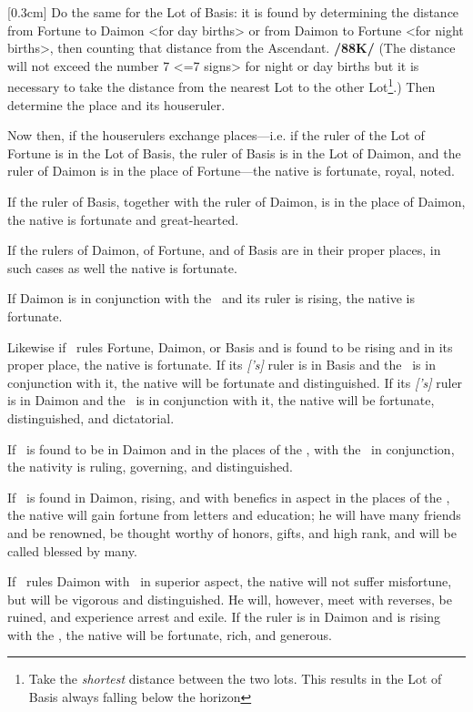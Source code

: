 [0.3cm]
Do the same for the Lot of Basis: it is found by determining the distance from Fortune to Daimon <for day births> or from Daimon to Fortune <for night births>, then counting that distance from the Ascendant. \textbf{/88K/} (The distance will not exceed the number 7 <=7 signs> for night or day births but it is necessary to take the distance from the nearest Lot to the other Lot\footnote{Take the \textsl{shortest} distance between the two lots. This results in the Lot of Basis always falling below the horizon}.) Then determine the place and its houseruler.

Now then, if the houserulers exchange places—i.e. if the ruler of the Lot of Fortune is in the Lot of Basis, the ruler of Basis is in the Lot of Daimon, and the ruler of Daimon is in the place of Fortune—the native is fortunate, royal, noted. 

If the ruler of Basis, together with the ruler of Daimon, is in the place of Daimon, the native is fortunate and great-hearted. 

If the rulers of Daimon, of Fortune, and of Basis are in
their proper places, in such cases as well the native is fortunate. 

If Daimon  is in conjunction with the \Sun\, and its ruler is rising, the native is fortunate. 

Likewise if \Venus\, rules Fortune, Daimon, or Basis and is found to be rising and in its proper place, the native is fortunate. If its \textsl{[\Venus's]} ruler is in Basis and the \Moon\, is in conjunction with it, the native will be fortunate and distinguished. If its \textsl{[\Venus's]} ruler is in Daimon and the \Sun\, is in conjunction with it, the native will be fortunate, distinguished, and dictatorial.

If \Mars\, is found to be in Daimon and in the places of the \Moon, with the \Moon\, in conjunction, the nativity is ruling, governing, and distinguished. 

If \Mercury\, is found in Daimon, rising, and with benefics in aspect in the places of the \Moon, the native will gain fortune from letters and education; he will have
many friends and be renowned, be thought worthy of honors, gifts, and high rank, and will be called blessed by many. 

If \Jupiter\, rules Daimon with \Mars\, in superior aspect, the native will not suffer misfortune, but will be vigorous and distinguished. He will, however, meet with reverses, be ruined, and experience arrest and exile. If the ruler is in Daimon and is rising with the \Moon, the native will be fortunate, rich, and generous. 


